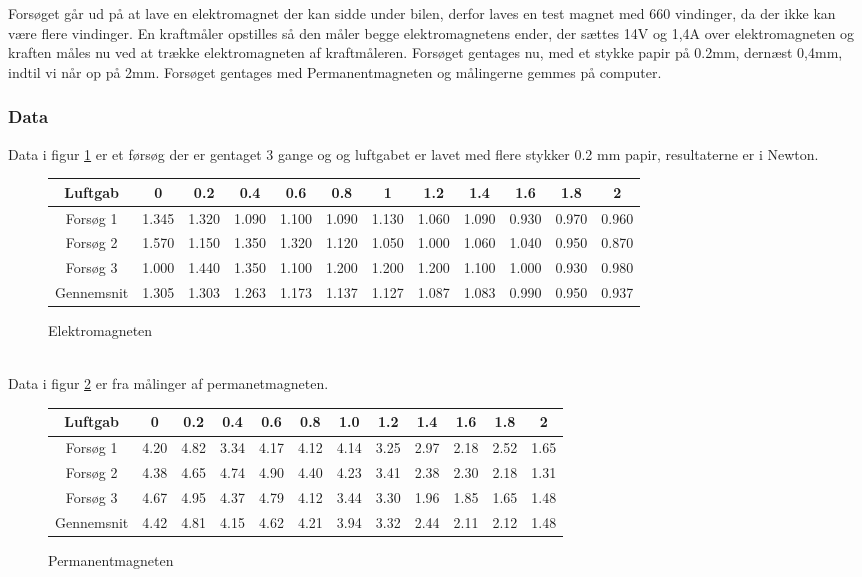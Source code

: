Forsøget går ud på at lave en elektromagnet der kan sidde under bilen, derfor laves en test magnet med 660 vindinger, da der ikke kan være flere vindinger. En kraftmåler opstilles så den måler begge elektromagnetens ender, der sættes 14V og 1,4A over elektromagneten og kraften måles nu ved at trække elektromagneten af kraftmåleren. Forsøget gentages nu, med et stykke papir på 0.2mm, dernæst 0,4mm, indtil vi når op på 2mm. Forsøget gentages med Permanentmagneten og målingerne gemmes på computer. \\



\subsubsection*{Data}
Data i figur \ref{elektrotabel} er et førsøg der er gentaget 3 gange og og luftgabet er lavet med flere stykker 0.2 mm papir, resultaterne er i Newton. \\
\begin{figure}[h!]
\begin{tabular}{|c|c|c|c|c|c|c|c|c|c|c|c|}
\hline 
Luftgab & 0 & 0.2 & 0.4 & 0.6 & 0.8 & 1 & 1.2 & 1.4 & 1.6 & 1.8 & 2 \\ 
\hline 
Forsøg 1 & 1.345 & 1.320 & 1.090 & 1.100 & 1.090 & 1.130 & 1.060 & 1.090 & 0.930 & 0.970 & 0.960 \\ 
\hline 
Forsøg 2 & 1.570 & 1.150 & 1.350 & 1.320 & 1.120 & 1.050 & 1.000 & 1.060 & 1.040 & 0.950 & 0.870 \\ 
\hline 
Forsøg 3 & 1.000 & 1.440 & 1.350 & 1.100 & 1.200 & 1.200 & 1.200 & 1.100 & 1.000 & 0.930 & 0.980 \\ 
\hline 
Gennemsnit & 1.305 & 1.303 & 1.263 & 1.173 & 1.137 & 1.127 & 1.087 & 1.083 & 0.990 & 0.950 & 0.937 \\ 
\hline 
\end{tabular}
\caption{Elektromagneten}
\label{elektrotabel}
\end{figure} \\

Data i figur \ref{permtabel} er fra målinger af permanetmagneten.\\

\begin{figure}[h!]
\begin{tabular}{|c|c|c|c|c|c|c|c|c|c|c|c|}
\hline
Luftgab & 0 & 0.2 & 0.4 & 0.6 & 0.8 & 1.0 & 1.2 & 1.4 & 1.6 & 1.8 & 2 \\
\hline
Forsøg 1 & 4.20 & 4.82 & 3.34 & 4.17 & 4.12 & 4.14 & 3.25 & 2.97 & 2.18 & 2.52 & 1.65 \\
\hline
Forsøg 2 & 4.38 & 4.65 & 4.74 & 4.90 & 4.40 & 4.23 & 3.41 & 2.38 & 2.30 & 2.18 & 1.31 \\
\hline
Forsøg 3 & 4.67 & 4.95 & 4.37 & 4.79 & 4.12 & 3.44 & 3.30 & 1.96 & 1.85 & 1.65 & 1.48 \\
\hline 
Gennemsnit & 4.42 & 4.81 & 4.15 & 4.62 & 4.21 & 3.94 & 3.32 & 2.44 & 2.11 & 2.12 & 1.48 \\
\hline
\end{tabular} 
\caption{Permanentmagneten}
\label{permtabel}
\end{figure}

